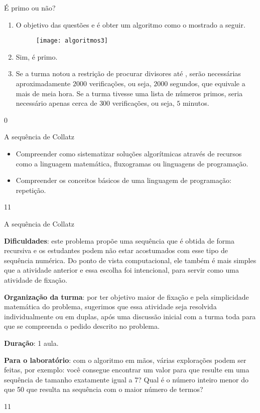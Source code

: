 \begin{answer}{É primo ou não?}
{
\begin{enumerate}
\item O objetivo das questões  e  é obter um algoritmo como o mostrado a seguir.

\begin{figure}[H]
\centering

\texttt{[image: algoritmos3]}
\end{figure}

\item Sim, é primo.

\item Se a turma notou a restrição de procurar divisores até , serão necessárias aproximadamente $2000$ verificações, ou seja, $2000$ segundos, que equivale a mais de meia hora. Se a turma tivesse uma lista de números primos, seria necessário apenas cerca de $300$ verificações, ou seja, $5$ minutos.
\end{enumerate}
}{0}
\end{answer}
\clearmargin
\begin{objectives}{A sequência de Collatz}
{
\begin{itemize}
\item Compreender como sistematizar soluções algorítmicas através de recursos como a linguagem matemática, fluxogramas ou linguagens de programação.

\item Compreender os conceitos básicos de uma linguagem de programação: repetição.
\end{itemize}
}{1}{1}
\end{objectives}
\begin{sugestions}{A sequência de Collatz}
{
\textbf{Dificuldades}: este problema propõe uma sequência que é obtida de forma recursiva e os estudantes podem não estar acostumados com esse tipo de sequência numérica. Do ponto de vista computacional, ele também é mais simples que a atividade anterior e essa escolha foi intencional, para servir como uma atividade de fixação.

\textbf{Organização da turma}: por ter objetivo maior de fixação e pela simplicidade matemática do problema, sugerimos que essa atividade seja resolvida individualmente ou em duplas, após uma discussão inicial com a turma toda para que se compreenda o pedido descrito no problema.

\textbf{Duração}: 1 aula.

\textbf{Para o laboratório}: com o algoritmo em mãos, várias explorações podem ser feitas, por exemplo: você consegue encontrar um valor para  que resulte em uma sequência de tamanho exatamente igual a 7? Qual é o número inteiro menor do que 50 que resulta na sequência com o maior número de termos?
}{1}{1}
\end{sugestions}
